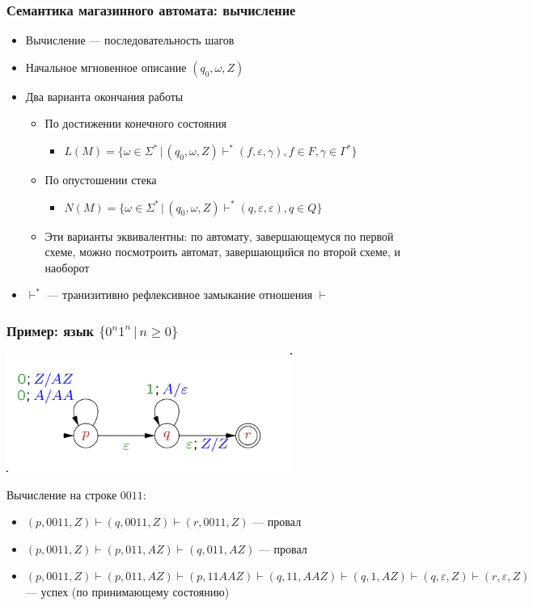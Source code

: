\documentclass{beamer}
\begin{document}
\begin{frame}[fragile]
  \transwipe[direction=90]
  \frametitle{Семантика магазинного автомата: вычисление}
  \begin{itemize}
    \item Вычисление --- последовательность шагов
    \item Начальное мгновенное описание $(q_0, \omega, Z)$
    \item Два варианта окончания работы
    \begin{itemize}
      \item По достижении конечного состояния
      \begin{itemize}
        \item $L(M) = \{ \omega \in \Sigma^* \, | \, (q_0, \omega, Z) \vdash^* (f, \varepsilon, \gamma), f \in F, \gamma \in \Gamma^* \}$
      \end{itemize}
      \item По опустошении стека
      \begin{itemize}
      	\item $N(M) = \{ \omega \in \Sigma^* \, | \, (q_0, \omega, Z) \vdash^* (q, \varepsilon, \varepsilon), q \in Q\}$
      \end{itemize}
      \item Эти варианты эквивалентны: по автомату, завершающемуся по первой схеме, можно посмотроить автомат, завершающийся по второй схеме, и наоборот
    \end{itemize}
    \item $\vdash^*$ --- транизитивно рефлексивное замыкание отношения $\vdash$
  \end{itemize}
\end{frame}

\begin{frame}[fragile]
  \transwipe[direction=90]
  \frametitle{Пример: язык $\{ 0^n 1^n \, | \, n \geq 0 \}$}
\begin{center}
  \includegraphics[width=0.7\textwidth]{pics/Pda-example.png}
\end{center}

Вычисление на строке $0011$:
\begin{itemize}
  \item $(p, 0011, Z) \vdash (q, 0011, Z) \vdash (r, 0011, Z)$ --- провал
  \item $(p, 0011, Z) \vdash (p, 011, AZ) \vdash (q, 011, AZ)$ --- провал
  \item $(p, 0011, Z) \vdash (p, 011, AZ) \vdash (p, 11 AAZ) \vdash (q, 11, AAZ) \vdash (q, 1, AZ) \vdash (q, \varepsilon, Z) \vdash (r, \varepsilon, Z)$ --- успех (по принимающему состоянию)
\end{itemize}

\end{frame}
\end{document}
